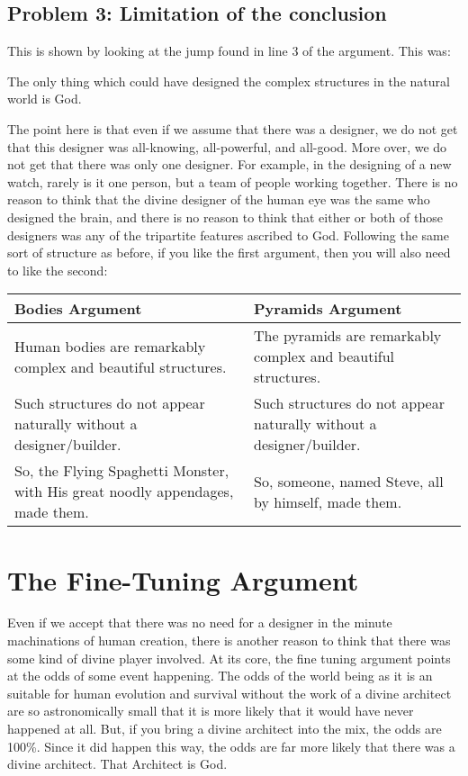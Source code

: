 \subsection{Problem 3: Limitation of the conclusion}

This is shown by looking at the jump found in line 3 of the argument. This was:

    \begin{center}The only thing which could have designed the complex structures in the natural world is God.\end{center}

The point here is that even if we assume that there was a designer, we do not get that this designer was all-knowing, all-powerful, and all-good. More over, we do not get that there was only one designer. For example, in the designing of a new watch, rarely is it one person, but a team of people working together. There is no reason to think that the divine designer of the human eye was the same who designed the brain, and there is no reason to think that either or both of those designers was any of the tripartite features ascribed to God. Following the same sort of structure as before, if you like the first argument, then you will also need to like the second:
\noindent
\begin{tabular}{p{2.75in}|p{2.75in}}
Bodies Argument&Pyramids Argument\\\hline
    Human bodies are remarkably complex and beautiful structures.&The pyramids are remarkably complex and beautiful structures.\\
    Such structures do not appear naturally without a designer/builder.&Such structures do not appear naturally without a designer/builder.\\
    So, the Flying Spaghetti Monster, with His great noodly appendages, made them.&So, someone, named Steve, all by himself, made them.
\end{tabular}

\section{The Fine-Tuning Argument}
Even if we accept that there was no need for a designer in the minute machinations of human creation, there is another reason to think that there was some kind of divine player involved. At its core, the fine tuning argument points at the odds of some event happening. The odds of the world being as it is an suitable for human evolution and survival without the work of a divine architect are so astronomically small that it is more likely that it would have never happened at all. But, if you bring a divine architect into the mix, the odds are 100\%. Since it did happen this way, the odds are far more likely that there was a divine architect. That Architect is God.

